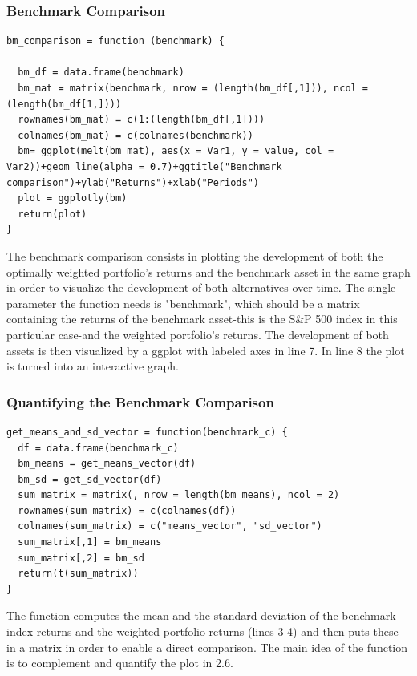 \documentclass{article}
\begin{document}
\subsubsection{Benchmark Comparison}
\begin{lstlisting}[caption={This example shows how a benchmark comparison is performed in R.}, label=code:1, frame=single]
bm_comparison = function (benchmark) {

  bm_df = data.frame(benchmark)
  bm_mat = matrix(benchmark, nrow = (length(bm_df[,1])), ncol = (length(bm_df[1,])))
  rownames(bm_mat) = c(1:(length(bm_df[,1])))
  colnames(bm_mat) = c(colnames(benchmark))
  bm= ggplot(melt(bm_mat), aes(x = Var1, y = value, col = Var2))+geom_line(alpha = 0.7)+ggtitle("Benchmark comparison")+ylab("Returns")+xlab("Periods")
  plot = ggplotly(bm)
  return(plot)
}
\end{lstlisting}
The benchmark comparison consists in plotting the development of both the optimally weighted portfolio's returns and the benchmark asset in the same graph in order to visualize the development of both alternatives over time. The single parameter the function needs is "benchmark", which should be a matrix containing the returns of the benchmark asset-this is the S&P 500 index in this particular case-and the weighted portfolio's returns. The development of both assets is then visualized by a ggplot with labeled axes in line 7. In line 8 the plot is turned into an interactive graph. 

\subsubsection{Quantifying the Benchmark Comparison}
\begin{lstlisting}[caption={Optimal portfolio vs. benchmark index: mean and SD}, label=code:1, frame=single]
get_means_and_sd_vector = function(benchmark_c) {
  df = data.frame(benchmark_c)
  bm_means = get_means_vector(df)
  bm_sd = get_sd_vector(df)
  sum_matrix = matrix(, nrow = length(bm_means), ncol = 2)
  rownames(sum_matrix) = c(colnames(df))
  colnames(sum_matrix) = c("means_vector", "sd_vector")
  sum_matrix[,1] = bm_means
  sum_matrix[,2] = bm_sd
  return(t(sum_matrix))
}
\end{lstlisting}
The function computes the mean and the standard deviation of the benchmark index returns and the weighted portfolio returns (lines 3-4) and then puts these in a matrix in order to enable a direct comparison. The main idea of the function is to complement and quantify the plot in 2.6.
\end{document}

